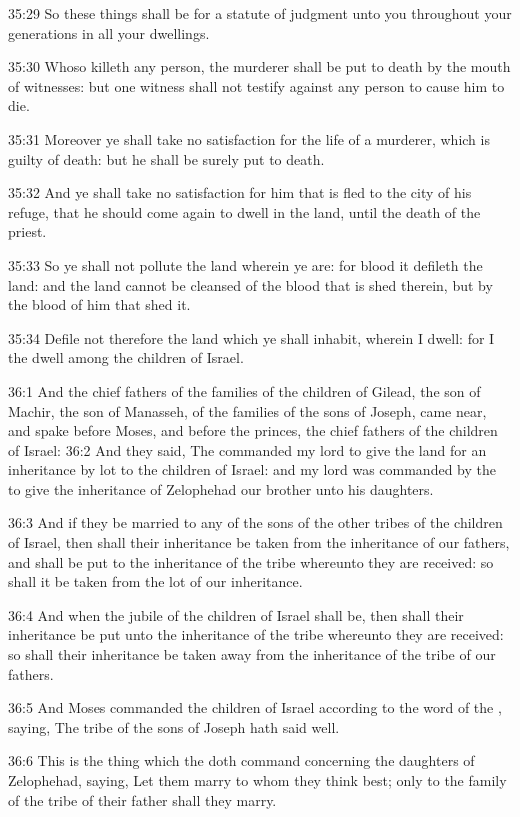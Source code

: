 35:29 So these things shall be for a statute of judgment unto you throughout your generations in all your dwellings.

35:30 Whoso killeth any person, the murderer shall be put to death by the mouth of witnesses: but one witness shall not testify against any person to cause him to die.

35:31 Moreover ye shall take no satisfaction for the life of a murderer, which is guilty of death: but he shall be surely put to death.

35:32 And ye shall take no satisfaction for him that is fled to the city of his refuge, that he should come again to dwell in the land, until the death of the priest.

35:33 So ye shall not pollute the land wherein ye are: for blood it defileth the land: and the land cannot be cleansed of the blood that is shed therein, but by the blood of him that shed it.

35:34 Defile not therefore the land which ye shall inhabit, wherein I dwell: for I the \LORD dwell among the children of Israel.

36:1 And the chief fathers of the families of the children of Gilead, the son of Machir, the son of Manasseh, of the families of the sons of Joseph, came near, and spake before Moses, and before the princes, the chief fathers of the children of Israel: 36:2 And they said, The \LORD commanded my lord to give the land for an inheritance by lot to the children of Israel: and my lord was commanded by the \LORD to give the inheritance of Zelophehad our brother unto his daughters.

36:3 And if they be married to any of the sons of the other tribes of the children of Israel, then shall their inheritance be taken from the inheritance of our fathers, and shall be put to the inheritance of the tribe whereunto they are received: so shall it be taken from the lot of our inheritance.

36:4 And when the jubile of the children of Israel shall be, then shall their inheritance be put unto the inheritance of the tribe whereunto they are received: so shall their inheritance be taken away from the inheritance of the tribe of our fathers.

36:5 And Moses commanded the children of Israel according to the word of the \LORD, saying, The tribe of the sons of Joseph hath said well.

36:6 This is the thing which the \LORD doth command concerning the daughters of Zelophehad, saying, Let them marry to whom they think best; only to the family of the tribe of their father shall they marry.

